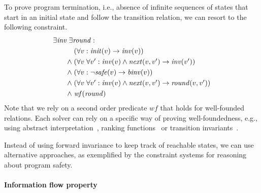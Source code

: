 \documentclass{new_tlp}
\newcommand{\limp}{\rightarrow}
\newcommand{\init}{\mathit{init}}
\newcommand{\next}{\mathit{next}}
\newcommand{\safe}{\mathit{safe}}
\newcommand{\inv}{\mathit{inv}}
\newcommand{\binv}{\mathit{binv}}
\newcommand{\round}{\mathit{round}}
\newcommand{\wf}{\mathit{wf}}
\begin{document}
To prove program termination, i.e., absence of infinite sequences of
states that start in an initial state and follow the transition
relation, we can resort to the following constraint.
\begin{equation*}
  \begin{array}[t]{@{}l@{}}
    \exists \inv\; \exists \round: \\[\jot]
    \qquad
    \begin{array}[t]{@{}l@{\;}l@{}}
      & (\forall v: \init(v) \limp \inv(v)) \\[\jot]
      \land & 
      (\forall v\; \forall v': \inv(v) \land \next(v, v') \limp \inv(v')) \\[\jot]
      \land & (\forall v: \neg\safe(v) \limp \binv(v)) \\[\jot]
      \land & (\forall v\;\forall v' : \inv(v) \land \next(v, v') \limp \round(v, v')) \\[\jot]
      \land & \wf(\round)
    \end{array}
  \end{array}
\end{equation*}
Note that we rely on a second order predicate $\wf$ that holds for
well-founded relations. 
Each solver can rely on a specific way of proving well-foundedness,
e.g., using abstract interpretation~\cite{CousotCousot-POPL12},
ranking functions~\cite{Turing49} or transition
invariants~\cite{LICS04,Thesis}.

Instead of using forward invariance to keep track of reachable states,
we can use alternative approaches, as exemplified by the constraint
systems for reasoning about program safety.

\paragraph{Information flow property}
\end{document}
